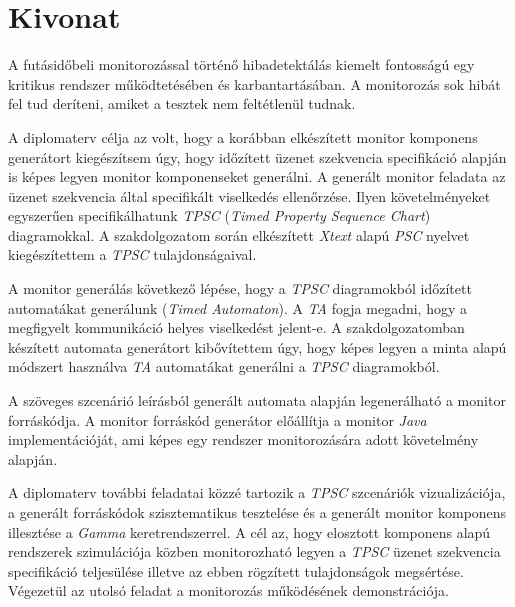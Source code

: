 \setcounter{page}{1}

\selecthungarian

\chapter*{Kivonat}

A futásidőbeli monitorozással történő hibadetektálás kiemelt fontosságú egy kritikus rendszer működtetésében és karbantartásában.
A monitorozás sok hibát fel tud deríteni, amiket a tesztek nem feltétlenül tudnak.

A diplomaterv célja az volt, hogy a korábban elkészített monitor komponens generátort kiegészítsem úgy, hogy időzített üzenet szekvencia specifikáció alapján is képes legyen monitor komponenseket generálni.
A generált monitor feladata az üzenet szekvencia által specifikált viselkedés ellenőrzése.
Ilyen követelményeket egyszerűen specifikálhatunk \textit{TPSC} (\textit{Timed Property Sequence Chart}) diagramokkal.
A szakdolgozatom során elkészített \textit{Xtext} alapú \textit{PSC} nyelvet kiegészítettem a \textit{TPSC} tulajdonságaival.

A monitor generálás következő lépése, hogy a \textit{TPSC} diagramokból időzített automatákat generálunk (\textit{Timed Automaton}).
A \textit{TA} fogja megadni, hogy a megfigyelt kommunikáció helyes viselkedést jelent-e.
A szakdolgozatomban készített automata generátort kibővítettem úgy, hogy képes legyen a minta alapú módszert használva \textit{TA} automatákat generálni a \textit{TPSC} diagramokból.

A szöveges szcenárió leírásból generált automata alapján legenerálható a monitor forráskódja.
A monitor forráskód generátor előállítja a monitor \textit{Java} implementációját, ami képes egy rendszer monitorozására adott követelmény alapján.

A diplomaterv további feladatai közzé tartozik a \textit{TPSC} szcenáriók vizualizációja, a generált forráskódok szisztematikus tesztelése és a generált monitor komponens illesztése a \textit{Gamma} keretrendszerrel.
A cél az, hogy elosztott komponens alapú rendszerek szimulációja közben monitorozható legyen a \textit{TPSC} üzenet szekvencia specifikáció teljesülése illetve az ebben rögzített tulajdonságok megsértése.
Végezetül az utolsó feladat a monitorozás működésének demonstrációja.

